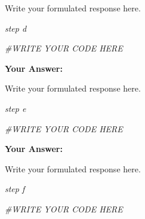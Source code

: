 \documentclass[
]{article}
\newenvironment{Shaded}{\begin{snugshade}}{\end{snugshade}}
\newcommand{\CommentTok}[1]{\textcolor[rgb]{0.56,0.35,0.01}{\textit{#1}}}
\begin{document}
Write your formulated response here.

\emph{step d}

\begin{Shaded}
\begin{Highlighting}[]
\CommentTok{\#WRITE YOUR CODE HERE}
\end{Highlighting}
\end{Shaded}

\textbf{Your Answer:}

Write your formulated response here.

\emph{step e}

\begin{Shaded}
\begin{Highlighting}[]
\CommentTok{\#WRITE YOUR CODE HERE}
\end{Highlighting}
\end{Shaded}

\textbf{Your Answer:}

Write your formulated response here.

\emph{step f}

\begin{Shaded}
\begin{Highlighting}[]
\CommentTok{\#WRITE YOUR CODE HERE}
\end{Highlighting}
\end{Shaded}
\end{document}
